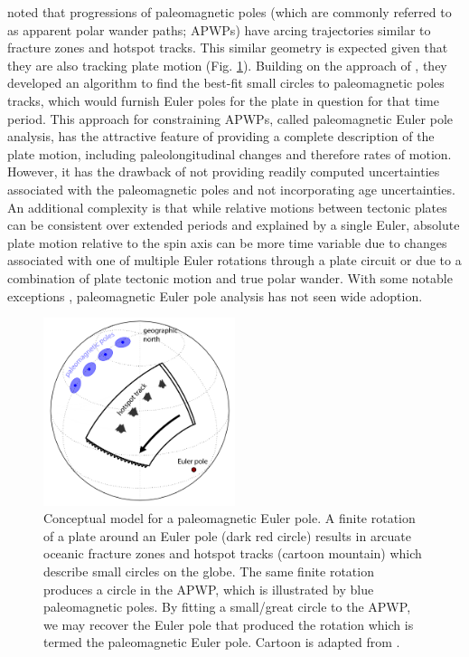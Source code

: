 \documentclass[11pt,letterpaper]{article}
\begin{document}
\cite{Gordon1984a} noted that progressions of paleomagnetic poles (which are commonly referred to as apparent polar wander paths; APWPs) have arcing trajectories similar to fracture zones and hotspot tracks. This similar geometry is expected given that they are also tracking plate motion (Fig. \ref{fig:pep}). Building on the approach of \cite{Francheteau1969a}, they developed an algorithm to find the best-fit small circles to paleomagnetic poles tracks, which would furnish Euler poles for the plate in question for that time period. This approach for constraining APWPs, called paleomagnetic Euler pole analysis, has the attractive feature of providing a complete description of the plate motion, including paleolongitudinal changes and therefore rates of motion. However, it has the drawback of not providing readily computed uncertainties associated with the paleomagnetic poles and not incorporating age uncertainties. An additional complexity is that while relative motions between tectonic plates can be consistent over extended periods and explained by a single Euler, absolute plate motion relative to the spin axis can be more time variable due to changes associated with one of multiple Euler rotations through a plate circuit or due to a combination of plate tectonic motion and true polar wander. With some notable exceptions \citep[e.g.][]{Bryan1986a, Beck1989a, Tarling1996a, Beck2003a, Smirnov2010a}, paleomagnetic Euler pole analysis has not seen wide adoption. 

\begin{figure}
\includegraphics[width=0.5\textwidth]{fig_PEP_annotated.png}
\caption{Conceptual model for a paleomagnetic Euler pole. A finite rotation of a plate around an Euler pole (dark red circle) results in arcuate oceanic fracture zones and hotspot tracks (cartoon mountain) which describe small circles on the globe. The same finite rotation produces a circle in the APWP, which is illustrated by blue paleomagnetic poles. By fitting a small/great circle to the APWP, we may recover the Euler pole that produced the rotation which is termed the paleomagnetic Euler pole. Cartoon is adapted from \cite{Gordon1984a}.}
\label{fig:pep}
\end{figure}
\end{document}
